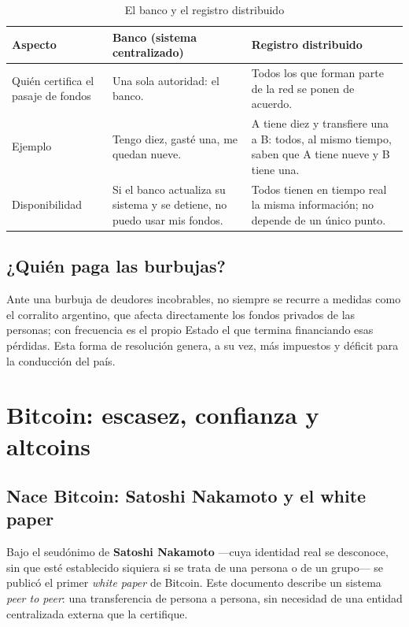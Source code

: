 \documentclass[12pt,oneside]{book}
\begin{document}
\begin{table}[H]
\centering
\caption{El banco y el registro distribuido}
\begin{tabular}{p{}p{}p{}}
\toprule
\textbf{Aspecto} & \textbf{Banco (sistema centralizado)} & \textbf{Registro distribuido} \\
\midrule
Quién certifica el pasaje de fondos & Una sola autoridad: el banco. & Todos los que forman parte de la red se ponen de acuerdo. \\
Ejemplo & Tengo diez, gasté una, me quedan nueve. & A tiene diez y transfiere una a B: todos, al mismo tiempo, saben que A tiene nueve y B tiene una. \\
Disponibilidad & Si el banco actualiza su sistema y se detiene, no puedo usar mis fondos. & Todos tienen en tiempo real la misma información; no depende de un único punto. \\
\bottomrule
\end{tabular}
\end{table}

\section{¿Quién paga las burbujas?}

Ante una burbuja de deudores incobrables, no siempre se recurre a medidas como el corralito argentino, que afecta directamente los fondos privados de las personas; con frecuencia es el propio Estado el que termina financiando esas pérdidas. Esta forma de resolución genera, a su vez, más impuestos y déficit para la conducción del país.

\chapter{Bitcoin: escasez, confianza y altcoins}

\section{Nace Bitcoin: Satoshi Nakamoto y el white paper}

Bajo el seudónimo de \textbf{Satoshi Nakamoto} —cuya identidad real se desconoce, sin que esté establecido siquiera si se trata de una persona o de un grupo— se publicó el primer \textit{white paper} de Bitcoin. Este documento describe un sistema \textit{peer to peer}: una transferencia de persona a persona, sin necesidad de una entidad centralizada externa que la certifique.
\end{document}

